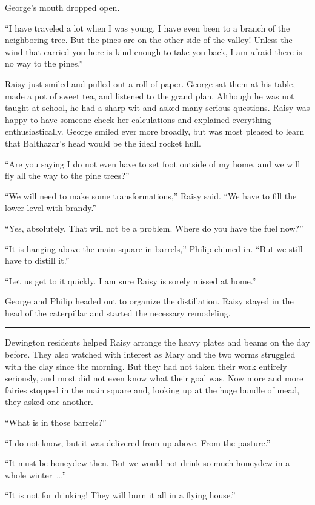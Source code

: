 \documentclass[10pt]{memoir}
\renewcommand{\pfbreakdisplay}{\bigskip \ding{166} \bigskip}
\newcommand{\secbreak}{\fancybreak{\pfbreakdisplay}}
\begin{document}
George's mouth dropped open.

``I have traveled a lot when I was young. I have even been to a branch of the
neighboring tree. But the pines are on the other side of the valley! Unless the
wind that carried you here is kind enough to take you back, I am afraid there
is no way to the pines.''

Raisy just smiled and pulled out a roll of paper. George sat them at his table,
made a pot of sweet tea, and listened to the grand plan. Although he was not
taught at school, he had a sharp wit and asked many serious questions. Raisy
was happy to have someone check her calculations and explained everything
enthusiastically. George smiled ever more broadly, but was most pleased to
learn that Balthazar's head would be the ideal rocket hull.

``Are you saying I do not even have to set foot outside of my home, and we
will fly all the way to the pine trees?''

``We will need to make some transformations,'' Raisy said. ``We have to fill
the lower level with brandy.''

``Yes, absolutely. That will not be a problem. Where do you have the fuel
now?''

``It is hanging above the main square in barrels,'' Philip chimed in. ``But we
still have to distill it.''

``Let us get to it quickly. I am sure Raisy is sorely missed at home.''

George and Philip headed out to organize the distillation. Raisy stayed in the
head of the caterpillar and started the necessary remodeling.

\secbreak

Dewington residents helped Raisy arrange the heavy plates and beams on the day
before. They also watched with interest as Mary and the two worms struggled
with the clay since the morning. But they had not taken their work entirely
seriously, and most did not even know what their goal was. Now more and more
fairies stopped in the main square and, looking up at the huge bundle of mead,
they asked one another.

``What is in those barrels?''

``I do not know, but it was delivered from up above. From the pasture.''

``It must be honeydew then. But we would not drink so much honeydew in a whole
winter~\dots''

``It is not for drinking! They will burn it all in a flying house.''
\end{document}
